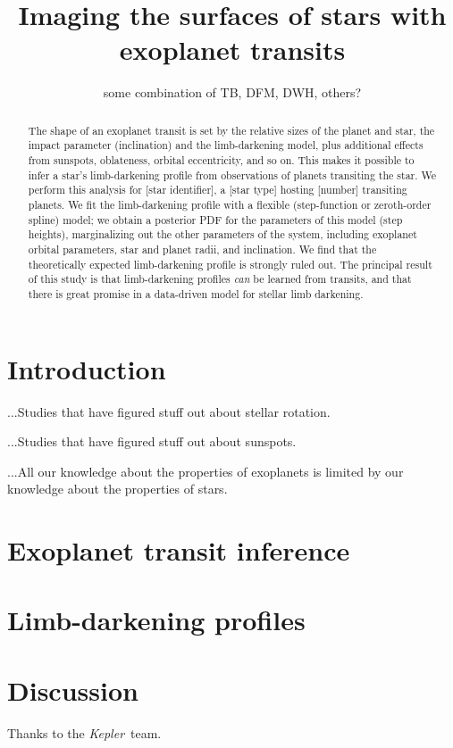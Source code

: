 \documentclass[12pt,letterpaper,preprint]{aastex}
\newcommand{\Kepler}{\textsl{Kepler}}
\begin{document}
\title{Imaging the surfaces of stars with exoplanet transits}
\author{some combination of TB, DFM, DWH, others?}

\begin{abstract}
The shape of an exoplanet transit is set by the relative sizes of the planet and
star, the impact parameter (inclination) and the limb-darkening model, plus
additional effects from sunspots, oblateness, orbital eccentricity, and so on.
%
This makes it possible to infer a star's limb-darkening profile from
observations of planets transiting the star.
%
We perform this analysis for [star identifier], a [star type] hosting [number]
transiting planets.
%
We fit the limb-darkening profile with a flexible (step-function or zeroth-order
spline) model; we obtain a posterior PDF for the parameters of this model (step
heights), marginalizing out the other parameters of the system, including
exoplanet orbital parameters, star and planet radii, and inclination.
%
We find that the theoretically expected limb-darkening profile is strongly ruled
out.
%
The principal result of this study is that limb-darkening profiles \emph{can} be
learned from transits, and that there is great promise in a data-driven model
for stellar limb darkening.
\end{abstract}


\section{Introduction}

...Studies that have figured stuff out about stellar rotation.

...Studies that have figured stuff out about sunspots.

...All our knowledge about the properties of exoplanets is limited by our
knowledge about the properties of stars.

\section{Exoplanet transit inference}

\section{Limb-darkening profiles}

\section{Discussion}

\acknowledgements
Thanks to the \Kepler\ team.
\end{document}
